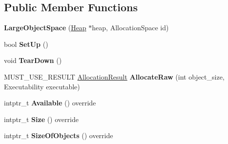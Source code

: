 \subsection*{Public Member Functions}
\begin{DoxyCompactItemize}
\item 
{\bfseries Large\+Object\+Space} (\hyperlink{classv8_1_1internal_1_1_heap}{Heap} $\ast$heap, Allocation\+Space id)\hypertarget{classv8_1_1internal_1_1_large_object_space_a66af439bbce805dece4e3db9ee5a3d98}{}\label{classv8_1_1internal_1_1_large_object_space_a66af439bbce805dece4e3db9ee5a3d98}

\item 
bool {\bfseries Set\+Up} ()\hypertarget{classv8_1_1internal_1_1_large_object_space_a0d6d297e876381ad6e2f0d63ed5051ac}{}\label{classv8_1_1internal_1_1_large_object_space_a0d6d297e876381ad6e2f0d63ed5051ac}

\item 
void {\bfseries Tear\+Down} ()\hypertarget{classv8_1_1internal_1_1_large_object_space_a4f1bf837df9444515b16160be0780838}{}\label{classv8_1_1internal_1_1_large_object_space_a4f1bf837df9444515b16160be0780838}

\item 
M\+U\+S\+T\+\_\+\+U\+S\+E\+\_\+\+R\+E\+S\+U\+LT \hyperlink{classv8_1_1internal_1_1_allocation_result}{Allocation\+Result} {\bfseries Allocate\+Raw} (int object\+\_\+size, Executability executable)\hypertarget{classv8_1_1internal_1_1_large_object_space_a75291aedc520f2efa326ff6c2d024b5e}{}\label{classv8_1_1internal_1_1_large_object_space_a75291aedc520f2efa326ff6c2d024b5e}

\item 
intptr\+\_\+t {\bfseries Available} () override\hypertarget{classv8_1_1internal_1_1_large_object_space_a8f6de3df513c9840802a44f022e545dd}{}\label{classv8_1_1internal_1_1_large_object_space_a8f6de3df513c9840802a44f022e545dd}

\item 
intptr\+\_\+t {\bfseries Size} () override\hypertarget{classv8_1_1internal_1_1_large_object_space_af4c3e56b891f31c9e703bd11f9c7ad56}{}\label{classv8_1_1internal_1_1_large_object_space_af4c3e56b891f31c9e703bd11f9c7ad56}

\item 
intptr\+\_\+t {\bfseries Size\+Of\+Objects} () override\hypertarget{classv8_1_1internal_1_1_large_object_space_a3daafc5d3afa9d1ca7960961bc83fe2c}{}\label{classv8_1_1internal_1_1_large_object_space_a3daafc5d3afa9d1ca7960961bc83fe2c}


\end{DoxyCompactItemize}
